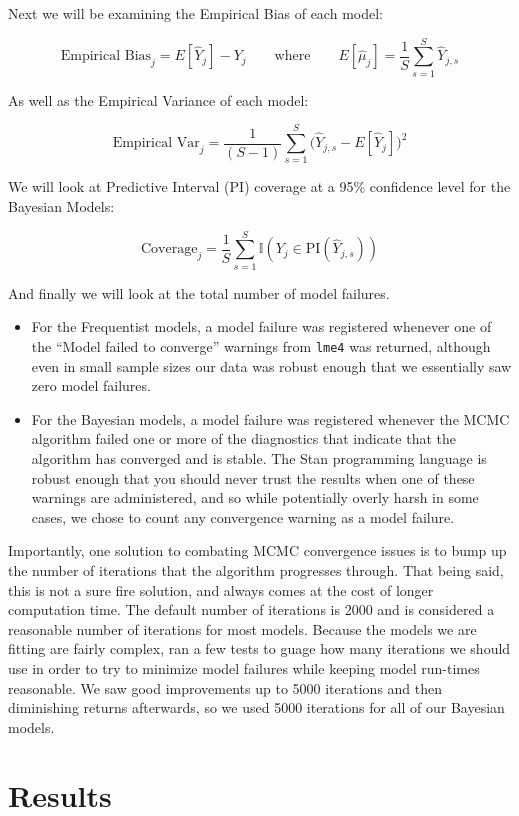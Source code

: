 \documentclass[12pt,twoside]{reedthesis}
\providecommand{\tightlist}{%
  \setlength{\itemsep}{0pt}\setlength{\parskip}{0pt}}
\begin{document}
Next we will be examining the Empirical Bias of each model:

\[
\text{Empirical Bias}_j = E[\hat{Y}_j] - Y_{j} \qquad \text{where} \qquad E[\hat{\mu}_j] = \frac{1}{S}\sum_{s = 1}^S\hat{Y}_{j, s}
\]

As well as the Empirical Variance of each model:

\[
\text{Empirical Var}_j  = \frac{1}{(S-1)}\sum_{s = 1}^S\Big(\hat{Y}_{j,s} - E[\hat{Y}_j]\Big)^2
\]

We will look at Predictive Interval (PI) coverage at a 95\% confidence level for the Bayesian Models:

\[
\text{Coverage}_j = \frac{1}{S}\sum_{s = 1}^S \mathbb{I}(Y_{j} \in \text{PI}(\hat{Y}_{j, s}))
\]

And finally we will look at the total number of model failures.
\begin{itemize}
\tightlist
\item
  For the Frequentist models, a model failure was registered whenever one of the ``Model failed to converge'' warnings from \texttt{lme4} was returned, although even in small sample sizes our data was robust enough that we essentially saw zero model failures.
\item
  For the Bayesian models, a model failure was registered whenever the MCMC algorithm failed one or more of the diagnostics that indicate that the algorithm has converged and is stable. The Stan programming language is robust enough that you should never trust the results when one of these warnings are administered, and so while potentially overly harsh in some cases, we chose to count any convergence warning as a model failure.
\end{itemize}
Importantly, one solution to combating MCMC convergence issues is to bump up the number of iterations that the algorithm progresses through. That being said, this is not a sure fire solution, and always comes at the cost of longer computation time. The default number of iterations is 2000 and is considered a reasonable number of iterations for most models. Because the models we are fitting are fairly complex, ran a few tests to guage how many iterations we should use in order to try to minimize model failures while keeping model run-times reasonable. We saw good improvements up to 5000 iterations and then diminishing returns afterwards, so we used 5000 iterations for all of our Bayesian models.

\hypertarget{res-sec}{%
\chapter{Results}\label{res-sec}}
\end{document}
